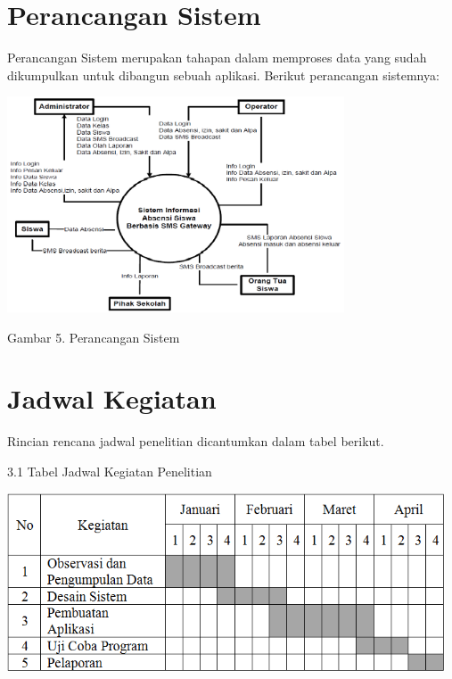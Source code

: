 \documentclass{jtetiproposalskripsi}
\begin{document}
\section{Perancangan Sistem}
Perancangan Sistem merupakan tahapan dalam memproses data yang sudah dikumpulkan untuk dibangun sebuah aplikasi. Berikut perancangan sistemnya:

\begin{center}
\includegraphics[width=10cm]{gambar/perancangansistem.png} 

Gambar 5. Perancangan Sistem
\end{center}


\section{Jadwal Kegiatan}
Rincian rencana jadwal penelitian dicantumkan dalam tabel berikut.

3.1 Tabel Jadwal Kegiatan Penelitian

\begin{center}
\includegraphics[width=13cm]{gambar/jadwal.png} 
\end{center}




\end{document}
